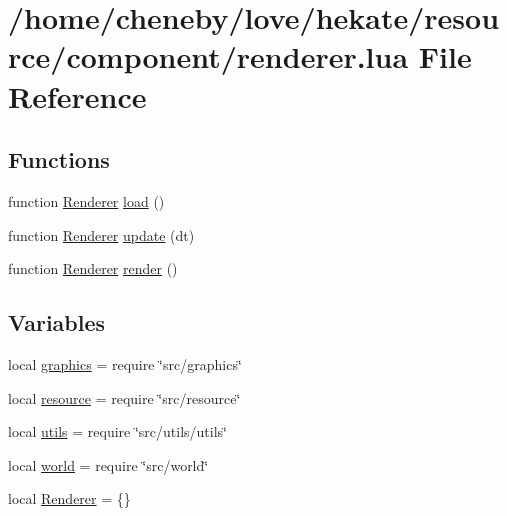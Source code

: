 \hypertarget{renderer_8lua}{\section{/home/cheneby/love/hekate/resource/component/renderer.lua File Reference}
\label{renderer_8lua}
}
\subsection*{Functions}
\begin{DoxyCompactItemize}
\item 
function \hyperlink{renderer_8lua_ae4ca4c644d523f931a9f0ac865e568a6}{Renderer} \hyperlink{renderer_8lua_ab25c31616f3d0fb50777d8b48aace98e}{load} ()
\item 
function \hyperlink{renderer_8lua_ae4ca4c644d523f931a9f0ac865e568a6}{Renderer} \hyperlink{renderer_8lua_a899214efd3d9bbbbe7ac4cb0f2f08868}{update} (dt)
\item 
function \hyperlink{renderer_8lua_ae4ca4c644d523f931a9f0ac865e568a6}{Renderer} \hyperlink{renderer_8lua_aa77d655d94916056674b12410215a5aa}{render} ()
\end{DoxyCompactItemize}
\subsection*{Variables}
\begin{DoxyCompactItemize}
\item 
local \hyperlink{renderer_8lua_aae06ace8bee01f93d02dfaa4436de916}{graphics} = require \char`\"{}src/graphics\char`\"{}
\item 
local \hyperlink{renderer_8lua_a24ad487107aaa56bef35825abbe9773d}{resource} = require \char`\"{}src/resource\char`\"{}
\item 
local \hyperlink{renderer_8lua_a9b2ba82def3d3656dc370bac0a641700}{utils} = require \char`\"{}src/utils/utils\char`\"{}
\item 
local \hyperlink{renderer_8lua_a054520f514ab0d9a9b0fede5a23db9f7}{world} = require \char`\"{}src/world\char`\"{}
\item 
local \hyperlink{renderer_8lua_ae4ca4c644d523f931a9f0ac865e568a6}{Renderer} = \{\}
\end{DoxyCompactItemize}


